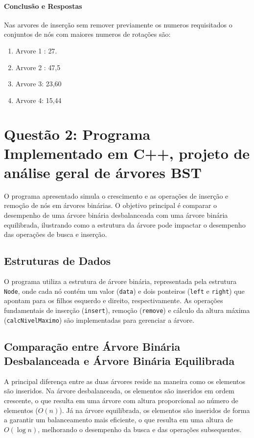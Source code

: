 \documentclass{article}
\begin{document}
\paragraph{Conclusão e Respostas} Nas arvores de inserção sem remover previamente os numeros requisitados o conjuntos de nós com maiores numeros de rotações são:
\begin{enumerate}
    \item Arvore 1 : {27}.
    \item Arvore 2 : {47,5}
    \item Arvore 3: {23,60}
    \item Arvore 4: {15,44}
\end{enumerate}

\section{Questão 2: Programa Implementado em C++, projeto de análise geral de árvores BST}

O programa apresentado simula o crescimento e as operações de inserção e remoção de nós em árvores binárias. O objetivo principal é comparar o desempenho de uma árvore binária desbalanceada com uma árvore binária equilibrada, ilustrando como a estrutura da árvore pode impactar o desempenho das operações de busca e inserção.

\subsection{Estruturas de Dados}
O programa utiliza a estrutura de árvore binária, representada pela estrutura \texttt{Node}, onde cada nó contém um valor (\texttt{data}) e dois ponteiros (\texttt{left} e \texttt{right}) que apontam para os filhos esquerdo e direito, respectivamente. As operações fundamentais de inserção (\texttt{insert}), remoção (\texttt{remove}) e cálculo da altura máxima (\texttt{calcNivelMaximo}) são implementadas para gerenciar a árvore.

\subsection{Comparação entre Árvore Binária Desbalanceada e Árvore Binária Equilibrada}
A principal diferença entre as duas árvores reside na maneira como os elementos são inseridos. Na árvore desbalanceada, os elementos são inseridos em ordem crescente, o que resulta em uma árvore com altura proporcional ao número de elementos (\(O(n)\)). Já na árvore equilibrada, os elementos são inseridos de forma a garantir um balanceamento mais eficiente, o que resulta em uma altura de \(O(\log n)\), melhorando o desempenho da busca e das operações subsequentes.
\end{document}
